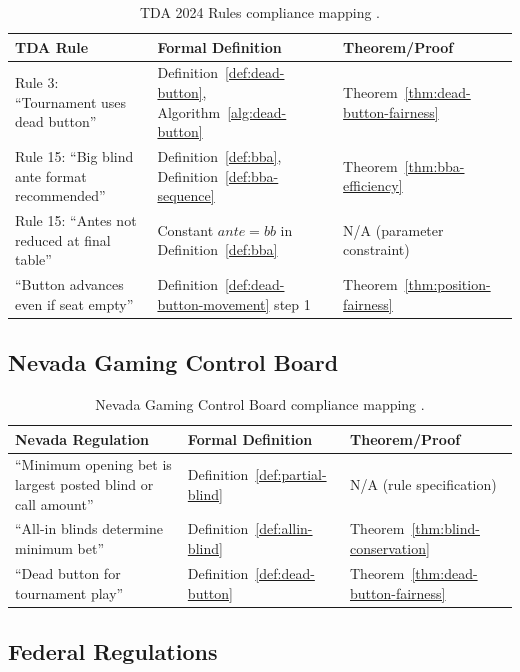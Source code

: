 \documentclass[11pt,a4paper]{article}
\begin{document}
\begin{table}[h]
\centering
\begin{tabular}{@{}p{5cm}p{5cm}p{3.5cm}@{}}
\toprule
\textbf{TDA Rule} & \textbf{Formal Definition} & \textbf{Theorem/Proof} \\
\midrule
Rule 3: ``Tournament uses dead button'' & Definition~\ref{def:dead-button}, Algorithm~\ref{alg:dead-button} & Theorem~\ref{thm:dead-button-fairness} \\
\midrule
Rule 15: ``Big blind ante format recommended'' & Definition~\ref{def:bba}, Definition~\ref{def:bba-sequence} & Theorem~\ref{thm:bba-efficiency} \\
\midrule
Rule 15: ``Antes not reduced at final table'' & Constant $ante = bb$ in Definition~\ref{def:bba} & N/A (parameter constraint) \\
\midrule
``Button advances even if seat empty'' & Definition~\ref{def:dead-button-movement} step 1 & Theorem~\ref{thm:position-fairness} \\
\bottomrule
\end{tabular}
\caption{TDA 2024 Rules compliance mapping \cite{tda2024rules}.}
\label{tab:tda-compliance}
\end{table}

\subsection{Nevada Gaming Control Board}

\begin{table}[h]
\centering
\begin{tabular}{@{}p{5cm}p{5cm}p{3.5cm}@{}}
\toprule
\textbf{Nevada Regulation} & \textbf{Formal Definition} & \textbf{Theorem/Proof} \\
\midrule
``Minimum opening bet is largest posted blind or call amount'' & Definition~\ref{def:partial-blind} & N/A (rule specification) \\
\midrule
``All-in blinds determine minimum bet'' & Definition~\ref{def:allin-blind} & Theorem~\ref{thm:blind-conservation} \\
\midrule
``Dead button for tournament play'' & Definition~\ref{def:dead-button} & Theorem~\ref{thm:dead-button-fairness} \\
\bottomrule
\end{tabular}
\caption{Nevada Gaming Control Board compliance mapping \cite{nevada2023gaming}.}
\label{tab:nevada-compliance}
\end{table}

\subsection{Federal Regulations}
\end{document}
